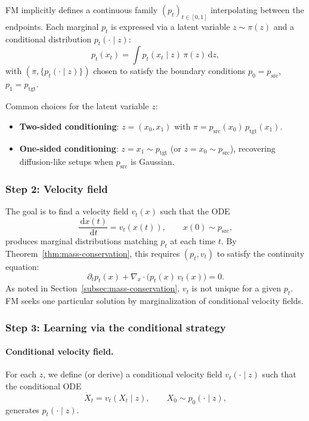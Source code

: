 \documentclass[11pt]{article}
\newcommand{\grad}{\nabla}
\newcommand{\dd}{\,\mathrm{d}}
\theoremstyle{definition}
\theoremstyle{remark}
\begin{document}
FM implicitly defines a continuous family $(p_t)_{t\in[0,1]}$ interpolating between the endpoints.
Each marginal $p_t$ is expressed via a latent variable $z\sim\pi(z)$ and a conditional distribution $p_t(\cdot\mid z)$:
\begin{equation}\label{eq:fm-marginal}
p_t(x_t) = \int p_t(x_t\mid z)\,\pi(z)\dd z,
\end{equation}
with $(\pi, \{p_t(\cdot\mid z)\})$ chosen to satisfy the boundary conditions $p_0 = p_{\mathrm{src}}$, $p_1 = p_{\mathrm{tgt}}$.

Common choices for the latent variable $z$:
\begin{itemize}[nosep]
\item \textbf{Two-sided conditioning}: $z = (x_0, x_1)$ with $\pi = p_{\mathrm{src}}(x_0)\,p_{\mathrm{tgt}}(x_1)$.
\item \textbf{One-sided conditioning}: $z = x_1 \sim p_{\mathrm{tgt}}$ (or $z = x_0\sim p_{\mathrm{src}}$), recovering diffusion-like setups when $p_{\mathrm{src}}$ is Gaussian.
\end{itemize}

\subsubsection{Step 2: Velocity field}

The goal is to find a velocity field $v_t(x)$ such that the ODE
\begin{equation}\label{eq:fm-ode}
\frac{\dd x(t)}{\dd t} = v_t(x(t)), \qquad x(0)\sim p_{\mathrm{src}},
\end{equation}
produces marginal distributions matching $p_t$ at each time $t$.
By Theorem~\ref{thm:mass-conservation}, this requires $(p_t, v_t)$ to satisfy the continuity equation:
\begin{equation}\label{eq:fm-cont}
\partial_t p_t(x) + \grad_x\cdot\big(p_t(x)\,v_t(x)\big) = 0.
\end{equation}
As noted in Section~\ref{subsec:mass-conservation}, $v_t$ is not unique for a given $p_t$.
FM seeks one particular solution by marginalization of conditional velocity fields.

\subsubsection{Step 3: Learning via the conditional strategy}

\paragraph{Conditional velocity field.}
For each $z$, we define (or derive) a conditional velocity field $v_t(\cdot\mid z)$ such that the conditional ODE
\[
\dot{X}_t = v_t(X_t\mid z), \qquad X_0\sim p_0(\cdot\mid z),
\]
generates $p_t(\cdot\mid z)$.
\end{document}
